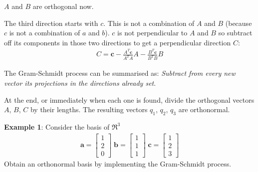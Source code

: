 \documentclass[10pt,a4paper]{article}
\begin{document}
$A$ and $B$ are orthogonal now.

The third direction starts with $c$. This is not a combination of $A$ and $B$ (because $c$ is not a
combination of $a$ and $b$). $c$ is not perpendicular to $A$ and $B$ so subtract off its components
in those two directions to get a perpendicular direction $C$:
\begin{align}
    C = \textbf{c} - \frac{A^T \textbf{c}}{A^T A} A - \frac{B^T \textbf{c}}{B^T B} B
\end{align}

The Gram-Schmidt process can be summarised as: \textit{Subtract from every new vector its
projections in the directions already set}.

At the end, or immediately when each one is found, divide the orthogonal vectors $A$, $B$, $C$ by
their lengths. The resulting vectors $q_1$, $q_2$, $q_3$ are orthonormal.

\textbf{Example 1}: Consider the basis of $\Re^3$
\begin{align*}
    \textbf{a} = \begin{bmatrix}
        1\\2\\0
    \end{bmatrix} \; \textbf{b} = \begin{bmatrix}
        1\\1\\1
    \end{bmatrix} \; \textbf{c} = \begin{bmatrix}
        1\\2\\3
    \end{bmatrix}
\end{align*}
Obtain an orthonormal basis by implementing the Gram-Schmidt process.
\end{document}
